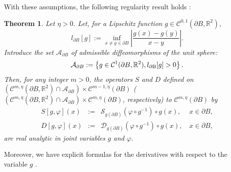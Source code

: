 \documentclass[final]{siamltex}
\numberwithin{equation}{section}
\numberwithin{figure}{section}
\numberwithin{table}{section}
\newtheorem{thm}{Theorem}
\begin{document}
With these assumptions, the following regularity result holds \cite{crisoforis2004}:
\begin{thm} \label{thm:analycity}Let $\eta>0$. Let, for
a Lipschitz function $g \in \mathcal{C}^{0,1}\left(\partial
B,\mathbb{R}^{2}\right)$,
\[
l_{\partial B}[g]:=\inf_{x\neq y\in\partial
B}\left|\frac{g(x)-g(y)}{x-y}\right|.
\]
Introduce the set $\mathcal{A}_{\partial B}$ of admissible
diffeomorphisms of the unit sphere:
\[
\mathcal{A}_{\partial B}:=\left\{ g\in \mathcal{C}^{1}(\partial
B,\mathbb{R}^{2}),l_{\text{\ensuremath{\partial}B}}[g]>0\right\} .
\]
 Then, for any integer $m>0$, the operators $S$ and $D$ defined on
  $\left(\mathcal{C}^{m,\eta}(\partial B,\mathbb{R}^{2})\cap\mathcal{A}_{\partial B}\right)
 \times \mathcal{C}^{m-1,\eta}(\partial B)$
($\left(\mathcal{C}^{m,\eta}(\partial
B,\mathbb{R}^{2})\cap\mathcal{A}_{\partial B}\right)\times
\mathcal{C}^{m,\eta}(\partial B)$, respectively) to
$\mathcal{C}^{m,\eta}(\partial B)$ by
\[
\begin{alignedat}{2}S[g,\varphi](x) & := & \mathcal{S}_{g(\partial B)}(\varphi \circ g^{-1})\circ g(x), & \, x\in\partial B,\\
D[g,\varphi](x) & := & \mathcal{D}_{g(\partial B)}(\varphi \circ
g^{-1})\circ g(x), & \, x\in\partial B,
\end{alignedat}
\]
 are real analytic in joint variables $g$ and $\varphi$.
\end{thm} Moreover, we have explicit formulas for the derivatives
with respect to the variable $g$ \cite{crisoforis2004}.
\end{document}
